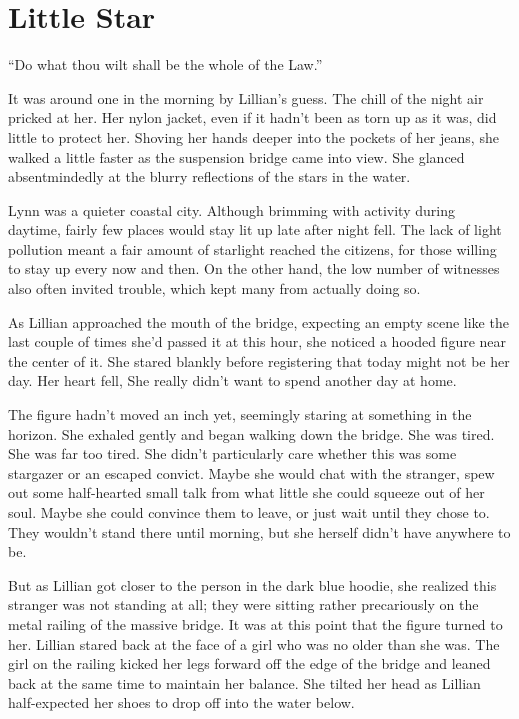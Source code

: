 \chapter{Little Star}
\begin{ChapterNote}
``Do what thou wilt shall be the whole of the Law.''
\end{ChapterNote}
\begin{Standard}
It was around one in the morning by Lillian's guess. The chill of the night air
pricked at her. Her nylon jacket, even if it hadn't been as torn up as it was, did little
to protect her. Shoving her hands deeper into the pockets of her jeans, she walked a
little faster as the suspension bridge came into view. She glanced absentmindedly
at the blurry reflections of the stars in the water.

Lynn was a quieter coastal city. Although brimming with activity during daytime,
fairly few places would stay lit up late after night fell. The lack of light pollution
meant a fair amount of starlight reached the citizens, for those willing to stay up
every now and then. On the other hand, the low number of witnesses also often invited
trouble, which kept many from actually doing so.

As Lillian approached the mouth of the bridge, expecting an empty scene like the last
couple of times she'd passed it at this hour, she noticed a hooded figure near the center
of it. She stared blankly before registering that today might not be her day. Her heart fell,
She really didn't want to spend another day at home.

The figure hadn't moved an inch yet, seemingly staring at something in the horizon.
She exhaled gently and began walking down the bridge. She was tired. She was far too tired.
She didn't particularly care whether this was some stargazer or an escaped convict.
Maybe she would chat with the stranger, spew out some half-hearted small talk from
what little she could squeeze out of her soul. Maybe she could convince them to leave, or just
wait until they chose to. They wouldn't stand there until morning, but she herself didn't
have anywhere to be.

But as Lillian got closer to the person in the dark blue hoodie, she realized this stranger
was not standing at all; they were sitting rather precariously on the metal railing of the
massive bridge. It was at this point that the figure turned to her. Lillian stared back at the
face of a girl who was no older than she was. The girl on the railing kicked her legs forward
off the edge of the bridge and leaned back at the same time to maintain her balance. She tilted
her head as Lillian half-expected her shoes to drop off into the water below.


\end{Standard}
